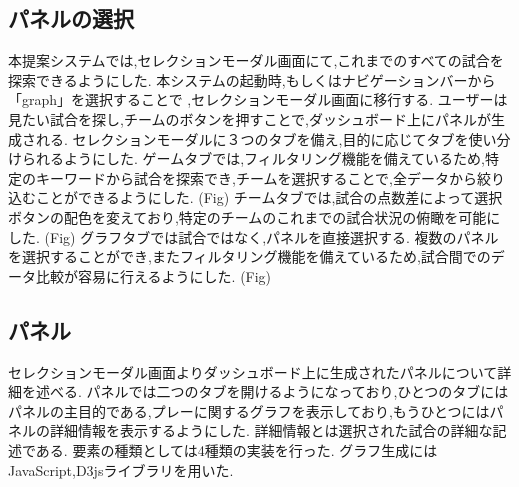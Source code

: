 \documentclass[sotsuron]{kuee}
\begin{document}
		\subsection{パネルの選択}
			本提案システムでは,セレクションモーダル画面にて,これまでのすべての試合を探索できるようにした. 
			本システムの起動時,もしくはナビゲーションバーから「graph」を選択することで	,セレクションモーダル画面に移行する. 
			ユーザーは見たい試合を探し,チームのボタンを押すことで,ダッシュボード上にパネルが生成される. 
			セレクションモーダルに３つのタブを備え,目的に応じてタブを使い分けられるようにした. 
			ゲームタブでは,フィルタリング機能を備えているため,特定のキーワードから試合を探索でき,チームを選択することで,全データから絞り込むことができるようにした. (Fig)
			チームタブでは,試合の点数差によって選択ボタンの配色を変えており,特定のチームのこれまでの試合状況の俯瞰を可能にした. (Fig)
			グラフタブでは試合ではなく,パネルを直接選択する. 複数のパネルを選択することができ,またフィルタリング機能を備えているため,試合間でのデータ比較が容易に行えるようにした. (Fig)
		\subsection{パネル}
			セレクションモーダル画面よりダッシュボード上に生成されたパネルについて詳細を述べる. 
			パネルでは二つのタブを開けるようになっており,ひとつのタブにはパネルの主目的である,プレーに関するグラフを表示しており,もうひとつにはパネルの詳細情報を表示するようにした. 詳細情報とは選択された試合の詳細な記述である. 
			要素の種類としては4種類の実装を行った. グラフ生成にはJavaScript,D3jsライブラリを用いた. 
\end{document}
